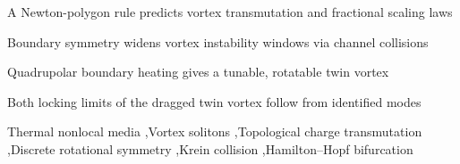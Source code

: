 \documentclass[preprint,12pt]{elsarticle}
\begin{document}
\begin{frontmatter}
\begin{highlights}
\item A Newton-polygon rule predicts vortex transmutation and fractional scaling laws
\item Boundary symmetry widens vortex instability windows via channel collisions
\item Quadrupolar boundary heating gives a tunable, rotatable twin vortex
\item Both locking limits of the dragged twin vortex follow from identified modes
\end{highlights}
\begin{keyword}
Thermal nonlocal media \sep Vortex solitons \sep Topological charge transmutation \sep Discrete rotational symmetry \sep Krein collision \sep Hamilton–Hopf bifurcation
\end{keyword}
\end{frontmatter}
\linenumbers





\end{document}
